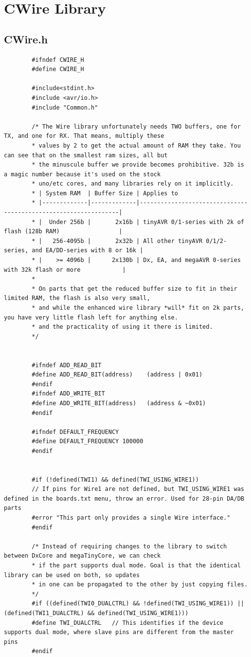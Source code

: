 \documentclass[11pt,a4paper,titlepage]{report}
\begin{document}
	\printbibliography
	
	\section{CWire Library}\label{appendix:cwire_library_code}
	\subsection{CWire.h}\label{appendix:cwire_h}
	\begin{lstlisting}
		#ifndef CWIRE_H
		#define	CWIRE_H
		
		#include<stdint.h>
		#include <avr/io.h>
		#include "Common.h"
		
		/* The Wire library unfortunately needs TWO buffers, one for TX, and one for RX. That means, multiply these
		* values by 2 to get the actual amount of RAM they take. You can see that on the smallest ram sizes, all but
		* the minuscule buffer we provide becomes prohibitive. 32b is a magic number because it's used on the stock
		* uno/etc cores, and many libraries rely on it implicitly.
		* | System RAM  | Buffer Size | Applies to
		* |-------------|-------------|----------------------------------------------------------------|
		* |  Under 256b |       2x16b | tinyAVR 0/1-series with 2k of flash (128b RAM)                 |
		* |   256-4095b |       2x32b | All other tinyAVR 0/1/2-series, and EA/DD-series with 8 or 16k |
		* |    >= 4096b |      2x130b | Dx, EA, and megaAVR 0-series with 32k flash or more            |
		*
		* On parts that get the reduced buffer size to fit in their limited RAM, the flash is also very small,
		* and while the enhanced wire library *will* fit on 2k parts, you have very little flash left for anything else.
		* and the practicality of using it there is limited.
		*/
		
		
		#ifndef ADD_READ_BIT
		#define ADD_READ_BIT(address)    (address | 0x01)
		#endif
		#ifndef ADD_WRITE_BIT
		#define ADD_WRITE_BIT(address)   (address & ~0x01)
		#endif
		
		#ifndef DEFAULT_FREQUENCY
		#define DEFAULT_FREQUENCY 100000
		#endif
		
		
		#if (!defined(TWI1) && defined(TWI_USING_WIRE1))
		// If pins for Wire1 are not defined, but TWI_USING_WIRE1 was defined in the boards.txt menu, throw an error. Used for 28-pin DA/DB parts
		#error "This part only provides a single Wire interface."
		#endif
		
		/* Instead of requiring changes to the library to switch between DxCore and megaTinyCore, we can check
		* if the part supports dual mode. Goal is that the identical library can be used on both, so updates
		* in one can be propagated to the other by just copying files.
		*/
		#if ((defined(TWI0_DUALCTRL) && !defined(TWI_USING_WIRE1)) || (defined(TWI1_DUALCTRL) && defined(TWI_USING_WIRE1)))
		#define TWI_DUALCTRL   // This identifies if the device supports dual mode, where slave pins are different from the master pins
		#endif
		

\end{lstlisting}
\end{document}
